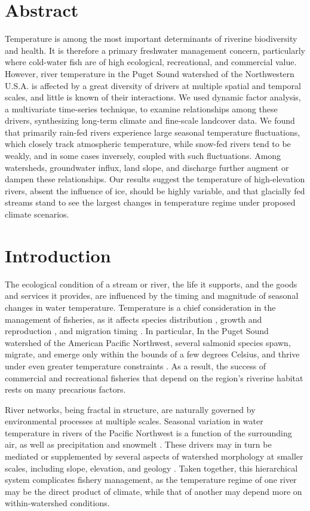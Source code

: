 \documentclass[notitlepage]{article}
\begin{document}
\section*{Abstract}
Temperature is among the most important determinants of riverine biodiversity and health. It is therefore a primary freshwater management concern, particularly where cold-water fish are of high ecological, recreational, and commercial value. However, river temperature in the Puget Sound watershed of the Northwestern U.S.A. is affected by a great diversity of drivers at multiple spatial and temporal scales, and little is known of their interactions. We used dynamic factor analysis, a multivariate time-series technique, to examine relationships among these drivers, synthesizing long-term climate and fine-scale landcover data. We found that primarily rain-fed rivers experience large seasonal temperature fluctuations, which closely track atmospheric temperature, while snow-fed rivers tend to be weakly, and in some cases inversely, coupled with such fluctuations. Among watersheds, groundwater influx, land slope, and discharge further augment or dampen these relationships. Our results suggest the temperature of high-elevation rivers, absent the influence of ice, should be highly variable, and that glacially fed streams stand to see the largest changes in temperature regime under proposed climate scenarios.
\clearpage

\section*{Introduction}

The ecological condition of a stream or river, the life it supports, and the goods and services it provides, are influenced by the timing and magnitude of seasonal changes in water temperature. Temperature is a chief consideration in the management of fisheries, as it affects species distribution \cite{Boisneau2008}, growth and reproduction \cite{mccullough1999review}, and migration timing \cite{boscarino2007effects}. In particular, In the Puget Sound watershed of the American Pacific Northwest, several salmonid species spawn, migrate, and emerge only within the bounds of a few degrees Celsius, and thrive under even greater temperature constraints \cite{carter2005effects}. As a result, the success of commercial and recreational fisheries that depend on the region's riverine habitat rests on many precarious factors. 

River networks, being fractal in structure, are naturally governed by environmental processes at multiple scales. Seasonal variation in water temperature in rivers of the Pacific Northwest is a function of the surrounding air, as well as precipitation and snowmelt \cite{eldridge1967water}. These drivers may in turn be mediated or supplemented by several aspects of watershed morphology at smaller scales, including slope, elevation, and geology \cite{poole2001ecological,lisi2013association}. Taken together, this hierarchical system complicates fishery management, as the temperature regime of one river may be the direct product of climate, while that of another may depend more on within-watershed conditions. 
\end{document}
